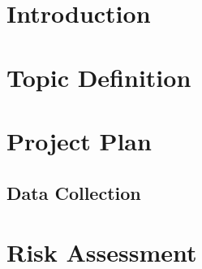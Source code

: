 \documentclass[a4paper]{article}
\begin{document}
\section{Introduction}

\section{Topic Definition}
\section{Project Plan}
\subsection{Data Collection}
\section{Risk Assessment}
\end{document}

